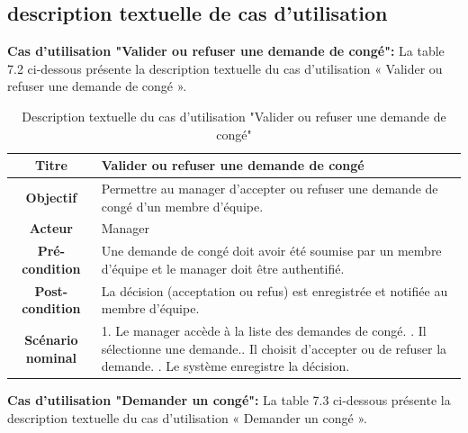 \subsection{description textuelle de cas d'utilisation}

     \item \textbf{Cas d'utilisation "Valider ou refuser une demande de congé": } La table 7.2 ci-dessous présente la description textuelle du cas d'utilisation « Valider ou refuser une demande de congé ».

 \begin{table}[H]
 \caption{ Description textuelle du cas d’utilisation "Valider ou refuser une demande de congé"}
    \centering
    \begin{tabular}{|c|p{12cm}|}
    \hline
    \textbf{Titre} & Valider ou refuser une demande de congé \\
    \hline
    \textbf{Objectif} & Permettre au manager d’accepter ou refuser une demande de congé d’un membre d’équipe. \\
    \hline
    \textbf{Acteur}& Manager\\
    \hline
    \textbf{Pré-condition} & Une demande de congé doit avoir été soumise par un membre d’équipe et le manager doit être authentifié.
    \\
    \hline
    \textbf{Post-condition} & La décision (acceptation ou refus) est enregistrée et notifiée au membre d’équipe.\\
    \hline
    \textbf{Scénario nominal} & 1. Le manager accède à la liste des demandes de congé. \newline
    2. Il sélectionne une demande.\newline
    3. Il choisit d’accepter ou de refuser la demande.
    \newline
    4. Le système enregistre la décision.\\
    \hline
    \end{tabular}
    \label{tab:user_stories}
\end{table}


     \item \textbf{Cas d'utilisation "Demander un congé": } La table 7.3 ci-dessous présente la description textuelle du cas d'utilisation « Demander un congé ».

